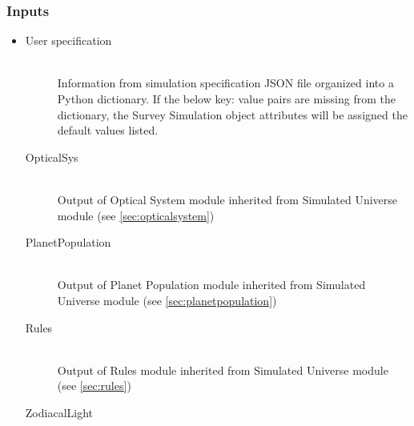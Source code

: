 \documentclass[cleanfoot]{asme2ej}
\begin{document}
\subsubsection*{Inputs}
\begin{itemize}
    \item 
    \begin{description}
        \item[User specification] \hfill \\
        Information from simulation specification JSON file organized into a Python dictionary. If the below key: value pairs are missing from the dictionary, the Survey Simulation object attributes will be assigned the default values listed.
        \item[OpticalSys] \hfill \\
        Output of Optical System module inherited from Simulated Universe module (see \ref{sec:opticalsystem})
        \item[PlanetPopulation] \hfill \\
        Output of Planet Population module inherited from Simulated Universe module (see \ref{sec:planetpopulation})
        \item[Rules] \hfill \\
        Output of Rules module inherited from Simulated Universe module (see \ref{sec:rules})
        \item[ZodiacalLight] \hfill \\

\end{description}
\end{itemize}
\end{document}
